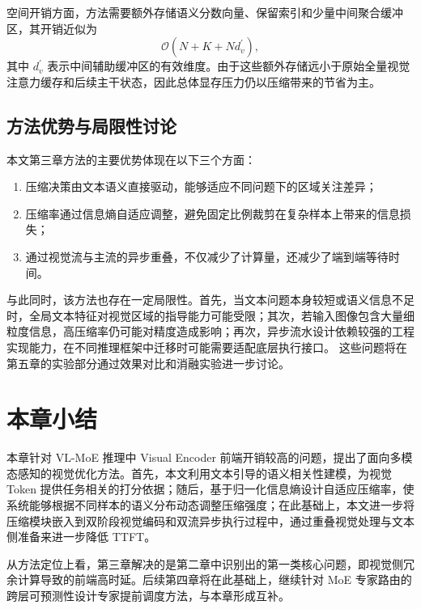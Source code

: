 空间开销方面，方法需要额外存储语义分数向量、保留索引和少量中间聚合缓冲区，其开销近似为
\begin{equation}
\mathcal{O}(N + K + N d_v^{\prime}),
\end{equation}
其中 $d_v^{\prime}$ 表示中间辅助缓冲区的有效维度。由于这些额外存储远小于原始全量视觉注意力缓存和后续主干状态，因此总体显存压力仍以压缩带来的节省为主。

\subsection{方法优势与局限性讨论}
本文第三章方法的主要优势体现在以下三个方面：
\begin{enumerate}
\item 压缩决策由文本语义直接驱动，能够适应不同问题下的区域关注差异；
\item 压缩率通过信息熵自适应调整，避免固定比例裁剪在复杂样本上带来的信息损失；
\item 通过视觉流与主流的异步重叠，不仅减少了计算量，还减少了端到端等待时间。
\end{enumerate}

与此同时，该方法也存在一定局限性。首先，当文本问题本身较短或语义信息不足时，全局文本特征对视觉区域的指导能力可能受限；其次，若输入图像包含大量细粒度信息，高压缩率仍可能对精度造成影响；再次，异步流水设计依赖较强的工程实现能力，在不同推理框架中迁移时可能需要适配底层执行接口。
这些问题将在第五章的实验部分通过效果对比和消融实验进一步讨论。

\section{本章小结}
本章针对 VL-MoE 推理中 Visual Encoder 前端开销较高的问题，提出了面向多模态感知的视觉优化方法。首先，本文利用文本引导的语义相关性建模，为视觉 Token 提供任务相关的打分依据；随后，基于归一化信息熵设计自适应压缩率，使系统能够根据不同样本的语义分布动态调整压缩强度；在此基础上，本文进一步将压缩模块嵌入到双阶段视觉编码和双流异步执行过程中，通过重叠视觉处理与文本侧准备来进一步降低 TTFT。

从方法定位上看，第三章解决的是第二章中识别出的第一类核心问题，即视觉侧冗余计算导致的前端高时延。后续第四章将在此基础上，继续针对 MoE 专家路由的跨层可预测性设计专家提前调度方法，与本章形成互补。
